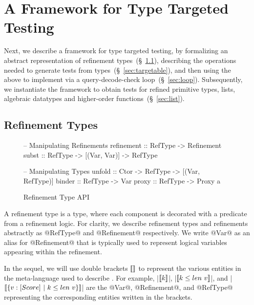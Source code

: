 \section{A Framework for Type Targeted Testing}\label{sec:framework}

Next, we describe a framework for type targeted testing, by formalizing
an abstract representation of refinement types~(\S~\ref{sec:reftypes}), 
describing the operations needed to generate tests from types~(\S~\ref{sec:targetable}), 
and then using the above to implement \toolname via a query-decode-check 
loop~(\S~\ref{sec:loop}). 
%
Subsequently, we instantiate the framework to obtain tests
for refined primitive types, lists, algebraic datatypes and higher-order 
functions~(\S~\ref{sec:list}).

 
\subsection{Refinement Types}\label{sec:reftypes}

\begin{figure}[t!]
\begin{mdframed}
\begin{CenteredBox}
\begin{code}
-- Manipulating Refinements
refinement :: RefType -> Refinement
subst      :: RefType -> [(Var, Var)] -> RefType

-- Manipulating Types
unfold     :: Ctor  -> RefType -> [(Var, RefType)]
binder     :: RefType -> Var
proxy      :: RefType -> Proxy a 
\end{code}
\end{CenteredBox}
\end{mdframed}
\caption{Refinement Type API}\label{fig:rtype}
\end{figure}

A refinement type is a type, where each component is 
decorated with a predicate from a refinement logic. 
%
For clarity, we describe refinement types and refinements 
abstractly as @RefType@ and @Refinement@ respectively.
%
We write @Var@ as an alias for @Refinement@ that is 
typically used to represent logical variables appearing
within the refinement.

In the sequel, we will use %
double brackets $[\![]\!]$ to represent the 
various entities in the meta-language used to describe \toolname. 
%
For example, 
|$[\![k]\!]$|,
|$[\![k \leq len\ v]\!]$|, and
|$[\![\{{v}:{[Score]}\ |\ {k \leq len\ v}\}]\!]$|
are the @Var@, @Refinement@, and @RefType@
representing the corresponding entities written in the brackets.


